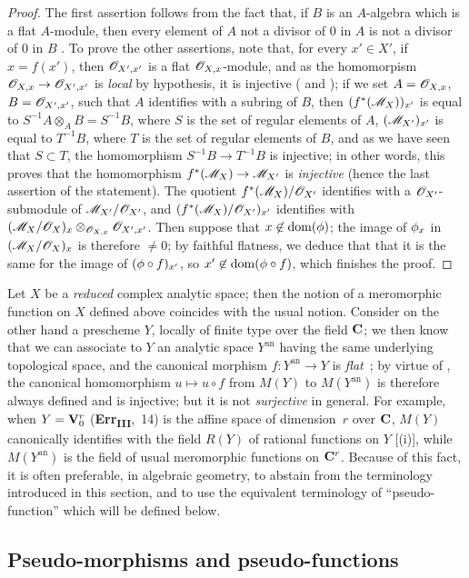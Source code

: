 \begin{proof}
The first assertion follows from the fact that, if $B$ is an $A$-algebra which is a flat $A$-module, then every element of $A$ not a divisor of $0$ in $A$ is not a divisor of $0$ in $B$ .
To prove the other assertions, note that, for every $x'\in X'$, if $x=f(x')$, then $\mathscr{O}_{X',x'}$ is a flat $\mathscr{O}_{X,x}$-module, and as the homomorpism $\sh{O}_{X,x}\to\sh{O}_{X',x'}$ is \emph{local} by hypothesis, it is injective ( and );
if we set $A=\mathscr{O}_{X,x}$, $B=\mathscr{O}_{X',x'}$, such that $A$ identifies with a subring of $B$, then $(f^*(\mathscr{M}_X))_{x'}$ is equal to $S^{-1}A\otimes_A B=S^{-1}B$, where $S$ is the set of regular elements of $A$, $(\mathscr{M}_{X'})_{x'}$ is equal to $T^{-1}B$, where $T$ is the set
of regular elements of $B$, and as we have seen that $S\subset T$, the homomorphism $S^{-1}B\to T^{-1}B$ is injective;
in other words, this proves that the homomorphism  $f^*(\sh{M}_X)\to\sh{M}_{X'}$ is \emph{injective} (hence the last assertion of the statement).
The quotient $f^*(\mathscr{M}_X)/\mathscr{O}_{X'}$ identifies with a $\mathscr{O}_{X'}$-submodule of $\mathscr{M}_{X'}/\mathscr{O}_{X'}$, and $(f^*(\mathscr{M}_X)/\mathscr{O}_{X'})_{x'}$ identifies with $(\mathscr{M}_X/\mathscr{O}_X)_x\otimes_{\mathscr{O}_{X,x}}\mathscr{O}_{X',x'}$.
Then suppose that $x\not\in\operatorname{dom}(\phi)$;
the image of $\phi_x$ in $(\mathscr{M}_X/\mathscr{O}_X)_x$ is therefore $\neq 0$;
by faithful flatness, we deduce that that it is the same for the image of $(\phi\circ f)_{x'}$, so $x'\not\in\operatorname{dom}(\phi\circ f)$, which finishes the proof.
\end{proof}

\begin{remark}[20.1.13]
\label{IV.20.1.13}
Let $X$ be a \emph{reduced} complex analytic space;
then the notion of a meromorphic function on $X$ defined above coincides with the usual notion.
Consider on the other hand a prescheme $Y$, locally of finite type over the field $\mathbf{C}$;
we then know that we can associate to $Y$ an analytic space $Y^\mathrm{an}$ having the same underlying topological space, and the canonical morphism $f:Y^\mathrm{an}\to Y$ is \emph{flat}~\cite{IV-37};
by virtue of , the canonical homomorphism $u\mapsto u\circ f$ from $M(Y)$ to $M(Y^\mathrm{an})$ is therefore always defined and is injective;
but it is not \emph{surjective} in general.
For example, when $Y=\mathbf{V}_0^r$ (\textbf{Err}\textsubscript{\textbf{III}},~14) is the affine space of dimension~$r$ over $\mathbf{C}$, $M(Y)$ canonically identifies with the field $R(Y)$ of rational functions on $Y$ [(i)], while $M(Y^\mathrm{an})$ is the field of usual meromorphic functions on $\mathbf{C}^r$.
Because of this fact, it is often preferable, in algebraic geometry, to abstain from the terminology introduced in this section, and to use the equivalent terminology of ``pseudo-function'' which will be defined below.
\end{remark}

\subsection{Pseudo-morphisms and pseudo-functions}
\label{IV.20.2}

